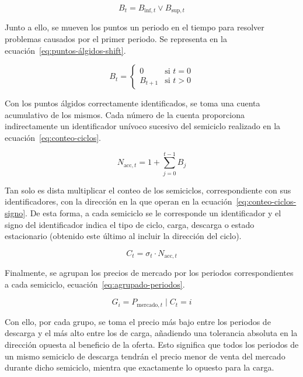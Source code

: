 \begin{equation}
  \label{eq:puntos-álgidos}
  B_{t} = B_{\text{inf}, t} \lor B_{\text{sup}, t}
\end{equation}

Junto a ello, se mueven los puntos un periodo en el tiempo para resolver problemas causados por el primer periodo. Se representa en la ecuación~\ref{eq:puntos-álgidos-shift}.

\begin{equation}
  \label{eq:puntos-álgidos-shift}
  B_t =
  \begin{cases}
    0       & \text{si } t = 0\\
    B_{t+1} & \text{si } t > 0
  \end{cases}
\end{equation}

Con los puntos álgidos correctamente identificados, se toma una cuenta acumulativo de los mismos. Cada número de la cuenta proporciona indirectamente un identificador unívoco sucesivo del semiciclo realizado en la ecuación~\ref{eq:conteo-ciclos}.

\begin{equation}
  \label{eq:conteo-ciclos}
  N_{\text{acc}, t} = 1 + \sum_{j=0}^{t-1} B_{j}
\end{equation}

Tan solo es dista multiplicar el conteo de los semiciclos, correspondiente con sus identificadores, con la dirección en la que operan en la ecuación~\ref{eq:conteo-ciclos-signo}. De esta forma, a cada semiciclo se le corresponde un identificador y el signo del identificador indica el tipo de ciclo, carga, descarga o estado estacionario (obtenido este último al incluir la dirección del ciclo).

\begin{equation}
  \label{eq:conteo-ciclos-signo}
  C_{t} = \sigma_{t} \cdot N_{\text{acc}, t}
\end{equation}

Finalmente, se agrupan los precios de mercado por los periodos correspondientes a cada semiciclo, ecuación~\ref{eq:agrupado-periodos}.

\begin{equation}
  \label{eq:agrupado-periodos}
  G_{i} = { P_{\text{mercado}, t} \mid C_{t} = i }
\end{equation}

Con ello, por cada grupo, se toma el precio más bajo entre los periodos de descarga y el más alto entre los de carga, añadiendo una tolerancia absoluta en la dirección opuesta al beneficio de la oferta. Esto significa que todos los periodos de un mismo semiciclo de descarga tendrán el precio menor de venta del mercado durante dicho semiciclo, mientra que exactamente lo opuesto para la carga.

